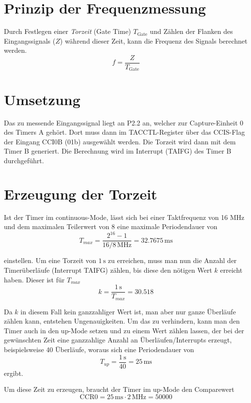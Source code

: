 \documentclass[a4paper, 12pt]{article}
\begin{document}
  
  \clearpage
  \setcounter{page}{1}
\section{Prinzip der Frequenzmessung}

Durch Festlegen einer \emph{Torzeit} (Gate Time) $T_{\textrm{Gate}}$ und Zählen der
Flanken des Eingangssignals ($Z$) während dieser Zeit, kann die Frequenz des Signals
berechnet werden.
\[f = \frac{Z}{T_{\textrm{Gate}}}\]

\section{Umsetzung}
Das zu messende Eingangssignal liegt an P2.2 an, welcher zur Capture-Einheit 0
des Timers A gehört. Dort muss dann im TACCTL-Register über das CCIS-Flag der
Eingang CCI0B (01b) ausgewählt werden. Die Torzeit wird dann mit dem Timer B
generiert. Die Berechnung wird im Interrupt (TAIFG) des Timer B durchgeführt.

\section{Erzeugung der Torzeit}
Ist der Timer im continuous-Mode, lässt sich bei einer Taktfrequenz von 16 MHz
und dem maximalen Teilerwert von 8 eine maximale Periodendauer von
\[T_{max} = \frac{2^{16}-1}{16/8 \,\si{\mega\hertz}} = 32.7675 \, \si{\milli\second}\]

einstellen. Um eine Torzeit von $1 \, \si{\second}$ zu erreichen, muss man nun
die Anzahl der Timerüberläufe (Interrupt TAIFG) zählen, bis diese den nötigen Wert $k$ erreicht haben.
Dieser ist für $T_{max}$
\[k = \frac{1 \, \si{\second}}{T_{max}} = 30.518\]

Da $k$ in diesem Fall kein ganzzahliger Wert ist, man aber nur ganze Überläufe
zählen kann, entstehen Ungenauigkeiten. Um das zu verhindern, kann man den Timer
auch in den up-Mode setzen und zu einem Wert zählen lassen, der bei der
gewünschten Zeit eine ganzzahlige Anzahl an Überläufen/Interrupts erzeugt,
beispielsweise 40 Überläufe, woraus sich eine Periodendauer von
\[T_{up} = \frac{1 \, \si{\second}}{40} = 25 \, \si{\milli\second}\]
ergibt.

Um diese Zeit zu erzeugen, braucht der Timer im up-Mode den Comparewert
\[\textrm{CCR0} = 25 \, \si{\milli\second} \cdot 2 \, \si{\mega\hertz} = 50000\]
\end{document}
